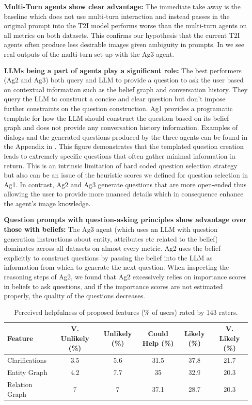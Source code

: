 \textbf{Multi-Turn agents show clear advantage:}
The immediate take away is the baseline which does not use multi-turn interaction and instead passes in the original prompt into the T2I model performs worse than the multi-turn agents on all metrics on both datasets. This confirms our hypothesis that the current T2I agents often produce less desirable images given ambiguity in prompts. In  we see real outputs of the multi-turn set up with the Ag3 agent.




\textbf{LLMs being a part of agents play a significant role:}
The best performers (Ag2 and Ag3) both query and LLM to provide a question to ask the user based on contextual information such as the belief graph and conversation history. They query the LLM to construct a concise and clear question but don't impose further constraints on the question construction. Ag1 provides a programatic template for how the LLM should construct the question based on its belief graph and does not provide any conversation history information. Examples of dialogs and the generated questions produced by the three agents can be found in the Appendix in . This figure demonstrates that the templated question creation leads to extremely specific questions that often gather minimal information in return. This is an intrinsic limitation of hard coded question selection strategy but also can be an issue of the heuristic scores we defined for question selection in Ag1. In contrast, Ag2 and Ag3 generate questions that are more open-ended thus allowing the user to provide more nuanced details which in consequence enhance the agent's image knowledge.

\textbf{Question prompts with question-asking principles show advantage over those with beliefs:}
The Ag3 agent (which uses an LLM with question generation instructions about entity, attributes etc related to the belief) dominates across all datasets on almost every metric. Ag2 uses the belief explicitly to construct questions by passing the belief into the LLM as information from which to generate the next question. When inspecting the reasoning steps of Ag2, we found that Ag2 excessively relies on importance scores in beliefs to ask questions, and if the importance scores are not estimated properly, the quality of the questions decreases. %

\begin{table}[t]
\centering
\small
\begin{tabular}{lccccc}
\toprule
\textbf{Feature} & \textbf{V. Unlikely (\%)} & \textbf{Unlikely (\%)} & \textbf{Could Help (\%)} & \textbf{Likely (\%)} & \textbf{V. Likely (\%)} \\ 
\midrule
Clarifications & 3.5 & 5.6 & 31.5 & 37.8 & 21.7 \\
Entity Graph & 4.2 & 7.7 & 35 & 32.9 & 20.3 \\
Relation Graph & 7 & 7 & 37.1 & 28.7 & 20.3 \\
\bottomrule
\end{tabular}
\caption{Perceived helpfulness of proposed features (\% of users) rated by 143 raters.}
\label{table_mitigation}
\end{table}


